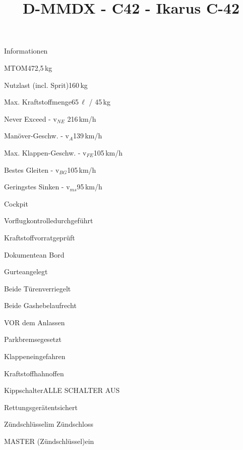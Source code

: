 \def\papersize{4}






\title{D-MMDX  -  C42  -  Ikarus C-42}

\begin{checklist}{Informationen}
 	\item{MTOM}{472,5\,kg}
  	\item{Nutzlast (incl. Sprit)}{160\,kg}
  	\item{Max. Kraftstoffmenge}{65\,${\ell}$ / 45\,kg}
 	  \item{Never Exceed  -  v$_{NE}$ }{216\,km/h}
	  \item{Manöver-Geschw.  -  v$_{A}$}{139\,km/h}
	  \item{Max. Klappen-Geschw.  -  v$_{FE}$}{105\,km/h}
	  \item{Bestes Gleiten  -  v$_{BG}$}{105\,km/h}
	  \item{Geringstes Sinken  -  v$_{ms}$}{95\,km/h}
\end{checklist}



\begin{checklist}{Cockpit}
	\item{Vorflugkontrolle}{durchgeführt}
	\item{Kraftstoffvorrat}{geprüft}
	\item{Dokumente}{an Bord}
	\item{Gurte}{angelegt}
	\item{Beide Türen}{verriegelt}
	\item{Beide Gashebel}{aufrecht}
\end{checklist}

\begin{checklist}{VOR dem Anlassen}
	\item{Parkbremse}{gesetzt}
	\item{Klappen}{eingefahren}
	\item{Kraftstoffhahn}{offen}
	\item{Kippschalter}{ALLE SCHALTER AUS}
	\item{Rettungsgerät}{entsichert}
	\item{Zündschlüssel}{im Zündschloss}
	\item{MASTER (Zündschlüssel)}{ein}
\end{checklist}

